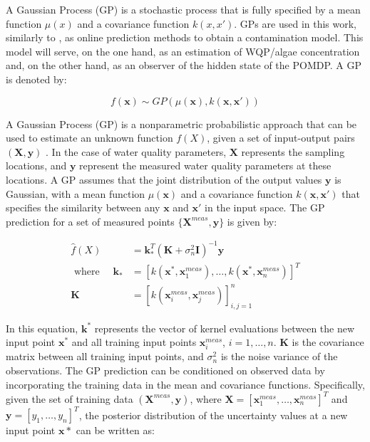 \documentclass[journal]{IEEEtran}
\newcommand\vect[1]{\boldsymbol{#1}}
\begin{document}
A Gaussian Process (GP) is a stochastic process that is fully specified by a mean function $\mu(x)$ and a covariance function $k(x,x')$. 
GPs are used in this work, similarly to \cite{peralta_MULTIOBJECTIVE}, as online prediction methods to obtain a contamination model. 
This model will serve, on the one hand, as an estimation of WQP/algae concentration and, on the other hand, as an observer of the hidden state of the POMDP. A GP is denoted by:

\begin{equation}
    f(\vect{x}) \sim GP(\mu(\vect{x}), k(\vect{x},\vect{x}'))
\end{equation}

A Gaussian Process (GP) is a nonparametric probabilistic approach that can be used to estimate an unknown function $f(X)$, given a set of input-output pairs $(\vect{X}, \vect{y})$ \cite{RasmussenBible}. In the case of water quality parameters, $\vect{X}$ represents the sampling locations, and $\vect{y}$ represent the measured water quality parameters at these locations. A GP assumes that the joint distribution of the output values $\vect{y}$ is Gaussian, with a mean function $\mu(\vect{x})$ and a covariance function $k(\vect{x},\vect{x}')$ that specifies the similarity between any $\vect{x}$ and $\vect{x}'$ in the input space. The GP prediction for a set of measured points $\{\vect{X}^{meas}, \vect{y}\}$ is given by:

\begin{equation}
\begin{aligned}
    \hat{f}\left(X\right) & =\vect{k}_*^T\left(\vect{K}+\sigma_n^2 \vect{I}\right)^{-1} \vect{y} \\
    \text { where } \quad \vect{k}_* & =\left[k\left(\vect{x}^*, \vect{x}^{meas}_1\right), \ldots, k\left(\vect{x}^*,\vect{x}^{meas}_n\right)\right]^T \\
    \vect{K} & =\left[k\left(\vect{x}^{meas}_i, \vect{x}^{meas}_j\right)\right]_{i, j=1}^n
\end{aligned}
\end{equation}


In this equation, $\mathbf{k}^*$ represents the vector of kernel evaluations between the new input point $\vect{x}^*$ and all training input points $\vect{x}^{meas}_i$, $i=1,\ldots,n$. $\mathbf{K}$ is the covariance matrix between all training input points, and $\sigma_n^2$ is the noise variance of the observations. The GP prediction can be conditioned on observed data by incorporating the training data in the mean and covariance functions. Specifically, given the set of training data $(\vect{X}^{meas}, \mathbf{y})$, where $\vect{X} = [\mathbf{x}_1^{meas}, \ldots, \mathbf{x}_n^{meas}]^T$ and $\mathbf{y} = [y_1, \ldots, y_n]^T$, the posterior distribution of the uncertainty values at a new input point $\vect{x}*$ can be written as:
\end{document}
